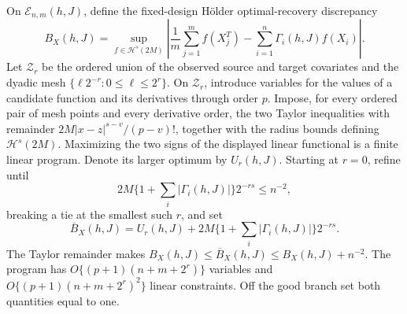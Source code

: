 On \(\mathcal E_{n,m}(h,J)\), define the fixed-design Hölder optimal-recovery discrepancy
\[
B_X(h,J)=\sup_{f\in\mathcal H^s(2M)}
\left|\frac1m\sum_{j=1}^mf(X_j^T)-\sum_{i=1}^n\Gamma_i(h,J)f(X_i)\right|.
\]
Let \(\mathcal Z_r\) be the ordered union of the observed source and target covariates and the dyadic mesh \(\{\ell2^{-r}:0\le\ell\le2^r\}\).  On \(\mathcal Z_r\), introduce variables for the values of a candidate function and its derivatives through order \(p\). Impose, for every ordered pair of mesh points and every derivative order, the two Taylor inequalities with remainder \(2M|x-z|^{s-v}/(p-v)!\), together with the radius bounds defining \(\mathcal H^s(2M)\). Maximizing the two signs of the displayed linear functional is a finite linear program. Denote its larger optimum by \(U_r(h,J)\).  Starting at \(r=0\), refine until
\[
2M\{1+\sum_i|\Gamma_i(h,J)|\}2^{-rs}\le n^{-2},
\]
breaking a tie at the smallest such \(r\), and set
\[
\overline B_X(h,J)=U_r(h,J)+2M\{1+\sum_i|\Gamma_i(h,J)|\}2^{-rs}.
\]
The Taylor remainder makes \(B_X(h,J)\le\overline B_X(h,J)\le B_X(h,J)+n^{-2}\). The program has \(O\{(p+1)(n+m+2^r)\}\) variables and \(O\{(p+1)(n+m+2^r)^2\}\) linear constraints.  Off the good branch set both quantities equal to one.